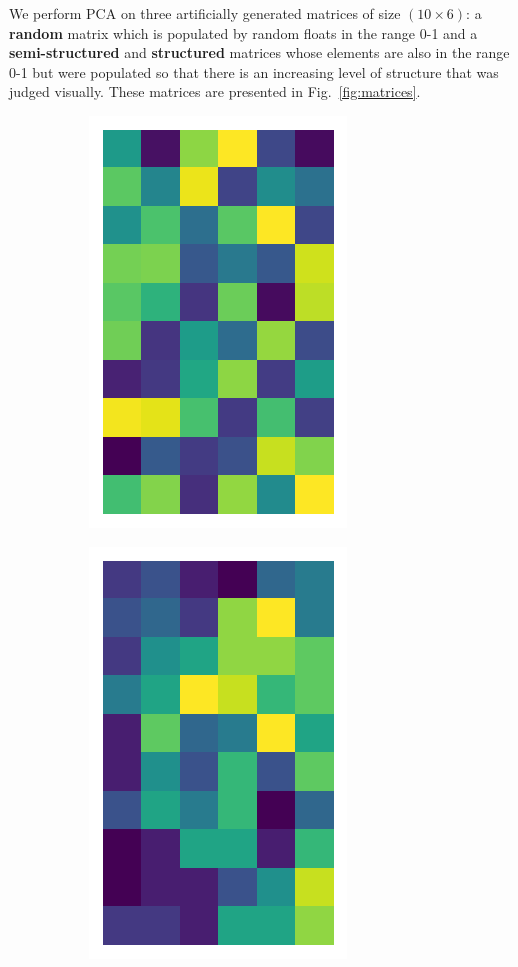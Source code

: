 \documentclass[10pt,twocolumn]{article}
\begin{document}
We perform PCA on three artificially generated matrices of size $(10 \times 6)$: a \textbf{random} matrix which is populated by random floats in the range 0-1 and a \textbf{semi-structured} and \textbf{structured} matrices whose elements are also in the range 0-1 but were populated so that there is an increasing level of structure that was judged visually. These matrices are presented in Fig.~\ref{fig:matrices}.

\begin{figure}[H]
\begin{subfigure}[t]{.15\textwidth}
\centering
\includegraphics[scale=.2]{random-matrix-original.png}
\caption{ }
\end{subfigure}
\begin{subfigure}[t]{.15\textwidth}
\centering
\includegraphics[scale=.2]{semi-structured-matrix-original.png}

\end{subfigure}
\end{figure}
\end{document}

